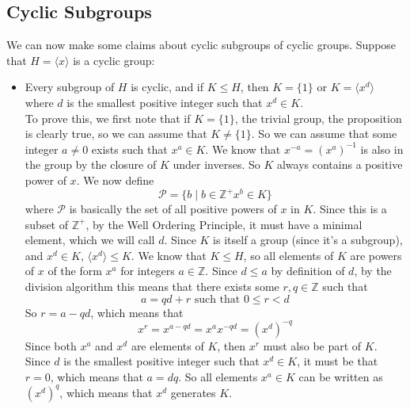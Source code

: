 \documentclass[12pt]{article}
\newcommand{\Z}{\mathbb{Z}}
\newcommand{\ang}[1]{\langle #1 \rangle}
\begin{document}
    \subsection*{Cyclic Subgroups}

    We can now make some claims about cyclic subgroups of
    cyclic groups.
    Suppose that $H = \ang{x}$ is a cyclic group:
    \begin{itemize}[label=$\diamond$]
        \item 
            Every subgroup of $H$ is cyclic,
            and if $K \leqslant H$,
            then $K = \{1\}$
            or $K = \ang{x^d}$
            where $d$ is the smallest positive integer
            such that $x^d \in K$. \\
            To prove this, we first note that
            if $K = \{1\}$, the trivial group,
            the proposition is clearly true,
            so we can assume that $K \neq \{1\}$.
            So we can assume that some integer $a \neq 0$
            exists such that $x^a \in K$.
            We know that $x^{-a} = (x^a)^{-1}$ is also in the group
            by the closure of $K$ under inverses.
            So $K$ always contains a positive power of $x$.
            We now define
            \[ \mathcal{P} = \{ b \mid b \in \Z^+ x^b \in K \} \]
            where $\mathcal{P}$ is basically the set of
            all positive powers of $x$ in $K$.
            Since this is a subset of $\Z^+$,
            by the Well Ordering Principle, 
            it must have a minimal element,
            which we will call $d$.
            Since $K$ is itself a group (since it's a subgroup),
            and $x^d \in K$,
            $\ang{x^d} \leqslant K$.
            We know that $K \leqslant H$,
            so all elements of $K$ are powers of $x$ of the form $x^a$
            for integers $a \in \Z$.
            Since $d \leqslant a$ by definition of $d$,
            by the division algorithm this means that 
            there exists some $r, q \in \Z$ such that
            \[ a = qd + r \text{ such that } 0 \leqslant r < d \]
            So $r = a - qd$,
            which means that
            \[ x^r = x^{a - qd} = x^ax^{-qd} = (x^d)^{-q} \]
            Since both $x^a$ and $x^d$ are elements of $K$,
            then $x^r$ must also be part of $K$.
            Since $d$ is the smallest positive integer
            such that $x^d \in K$,
            it must be that $r = 0$,
            which means that $a = dq$.
            So all elements $x^a \in K$ can be written as $(x^d)^q$,
            which means that $x^d$ generates $K$.

\end{itemize}
\end{document}
